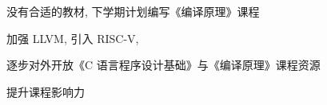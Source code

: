 \begin{frame}{}
  \begin{center}
    没有合适的教材, 下学期计划编写《编译原理》课程


    加强 LLVM, 引入 RISC-V, 
  \end{center}
\end{frame}

\begin{frame}{}
  \begin{center}
    逐步对外开放《C 语言程序设计基础》与《编译原理》课程资源

    \vspace{0.30cm}
    \vspace{0.30cm}

    提升课程影响力
  \end{center}
\end{frame}
